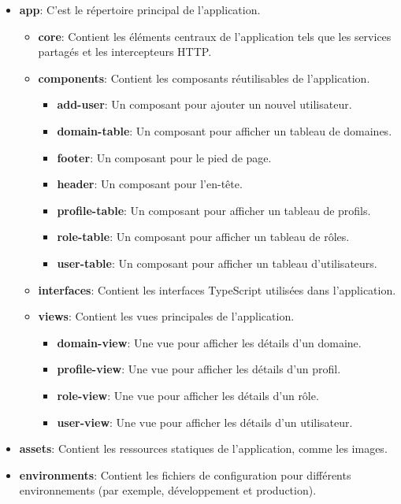 \documentclass[a4paper, 11pt]{report}
\begin{document}
\begin{itemize}
\tightlist
\item
  \textbf{app}: C'est le répertoire principal de l'application.

  \begin{itemize}
  \tightlist
  \item
    \textbf{core}: Contient les éléments centraux de l'application tels
    que les services partagés et les intercepteurs HTTP.
  \item
    \textbf{components}: Contient les composants réutilisables de
    l'application.

    \begin{itemize}
    \tightlist
    \item
      \textbf{add-user}: Un composant pour ajouter un nouvel
      utilisateur.
    \item
      \textbf{domain-table}: Un composant pour afficher un tableau de
      domaines.
    \item
      \textbf{footer}: Un composant pour le pied de page.
    \item
      \textbf{header}: Un composant pour l'en-tête.
    \item
      \textbf{profile-table}: Un composant pour afficher un tableau de
      profils.
    \item
      \textbf{role-table}: Un composant pour afficher un tableau de
      rôles.
    \item
      \textbf{user-table}: Un composant pour afficher un tableau
      d'utilisateurs.
    \end{itemize}
  \item
    \textbf{interfaces}: Contient les interfaces TypeScript utilisées
    dans l'application.
  \item
    \textbf{views}: Contient les vues principales de l'application.

    \begin{itemize}
    \tightlist
    \item
      \textbf{domain-view}: Une vue pour afficher les détails d'un
      domaine.
    \item
      \textbf{profile-view}: Une vue pour afficher les détails d'un
      profil.
    \item
      \textbf{role-view}: Une vue pour afficher les détails d'un rôle.
    \item
      \textbf{user-view}: Une vue pour afficher les détails d'un
      utilisateur.
    \end{itemize}
  \end{itemize}
\item
  \textbf{assets}: Contient les ressources statiques de l'application,
  comme les images.
\item
  \textbf{environments}: Contient les fichiers de configuration pour
  différents environnements (par exemple, développement et production).
\end{itemize}
\end{document}
